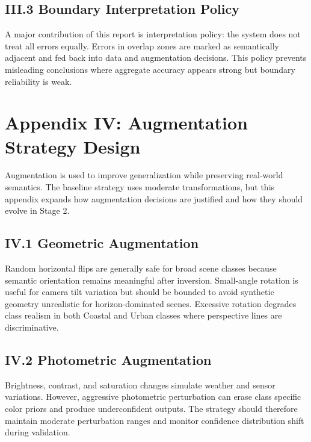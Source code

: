 \subsection*{III.3 Boundary Interpretation Policy}
A major contribution of this report is interpretation policy: the system does not treat all errors equally. Errors in overlap zones are marked as semantically adjacent and fed back into data and augmentation decisions. This policy prevents misleading conclusions where aggregate accuracy appears strong but boundary reliability is weak.

\section*{Appendix IV: Augmentation Strategy Design}

Augmentation is used to improve generalization while preserving real-world semantics. The baseline strategy uses moderate transformations, but this appendix expands how augmentation decisions are justified and how they should evolve in Stage 2.

\subsection*{IV.1 Geometric Augmentation}
Random horizontal flips are generally safe for broad scene classes because semantic orientation remains meaningful after inversion. Small-angle rotation is useful for camera tilt variation but should be bounded to avoid synthetic geometry unrealistic for horizon-dominated scenes. Excessive rotation degrades class realism in both Coastal and Urban classes where perspective lines are discriminative.

\subsection*{IV.2 Photometric Augmentation}
Brightness, contrast, and saturation changes simulate weather and sensor variations. However, aggressive photometric perturbation can erase class specific color priors and produce underconfident outputs. The strategy should therefore maintain moderate perturbation ranges and monitor confidence distribution shift during validation.

